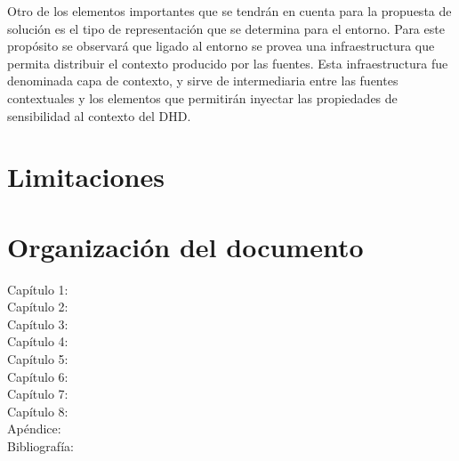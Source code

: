 Otro de los elementos importantes que se tendrán en cuenta para la
propuesta de solución es el tipo de representación que se
determina para el entorno. Para este propósito se observará que ligado al
entorno se provea una infraestructura que permita distribuir el contexto
producido por las fuentes. Esta infraestructura fue denominada capa de contexto,
y sirve de intermediaria entre las fuentes contextuales y los elementos que
permitirán inyectar las propiedades de sensibilidad al contexto del DHD.


\section{Limitaciones}	


\section{Organización del documento}

\begin{description}
 \item[Capítulo 1:]
 \item[Capítulo 2:]
 \item[Capítulo 3:]
 \item[Capítulo 4:]
 \item[Capítulo 5:]
 \item[Capítulo 6:]
 \item[Capítulo 7:]
 \item[Capítulo 8:]
 \item[Apéndice:]
 \item[Bibliografía:]
\end{description}


